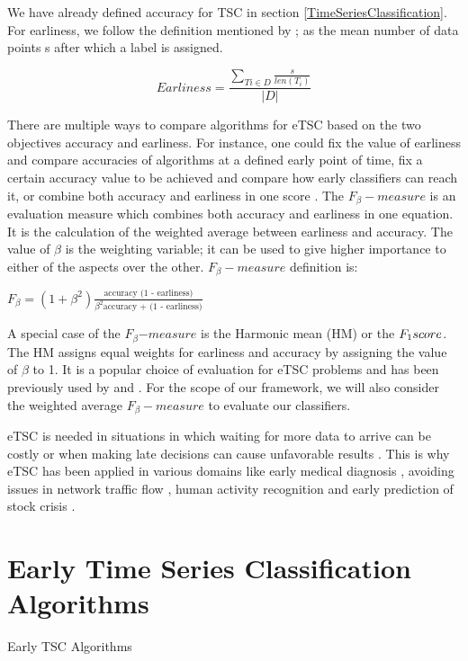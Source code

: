 We have already defined accuracy for TSC in section \ref{TimeSeriesClassification}.
For earliness, we follow the definition mentioned by \cite{schafer2020teaser}; as the mean number of data points s after which a label is assigned.
\begin{definition}
    \label{DefinitionEarliness}
    \[ \textstyle Earliness = \frac{\sum_{T{i}\in D}\frac{s}{len(T_{i})}}{|D|} \]
\end{definition}
There are multiple ways to compare algorithms for eTSC based on the two objectives accuracy and earliness.
For instance, one could fix the value of earliness and compare accuracies of algorithms at a defined early point of time,
fix a certain accuracy value to be achieved and compare how early classifiers can reach it, or combine both accuracy and earliness in one score \cite{schafer2020teaser}.
The $F_{\beta}-measure$ is an evaluation measure which combines both accuracy and earliness in one equation.
It is the calculation of the weighted average between earliness and accuracy.
The value of $\beta$ is the weighting variable; it can be used to give higher importance to either of the aspects over the other.
$F_{\beta}-measure$ definition is:
\begin{definition}
    \label{DefinitionHM}
    $F_{\beta} = (1 + \beta^2)\frac{\text{accuracy (1 - earliness)}}{\beta^2 \text{accuracy + (1 - earliness)}}$
\end{definition}

A special case of the $F_{\beta}$$-$$measure$ is the Harmonic mean (HM) or the $F_{1}\-score$.
The HM assigns equal weights for earliness and accuracy by assigning the value of $\beta$ to 1.
It is a popular choice of evaluation for eTSC problems and has been previously used by \cite{ghalwash2012early} and \cite{schafer2020teaser}.
For the scope of our framework, we will also consider the weighted average $F_{\beta}-measure$ to evaluate our classifiers.

eTSC is needed in situations in which waiting for more data to arrive can be costly or
when making late decisions can cause unfavorable results \cite{mori2017early,parrish2013classifying,lin2015reliable}.
This is why eTSC has been applied in various domains like early medical diagnosis \cite{griffin2001toward,ghalwash2012early},
avoiding issues in network traffic flow \cite{bernaille2006traffic}, human activity recognition \cite{yazdanbakhsh2019multivariate,gupta2020fault}
and early prediction of stock crisis \cite{ghalwash2014utilizing}.

\section{Early Time Series Classification Algorithms}
\label{SectionETSCA}
{Early TSC Algorithms}